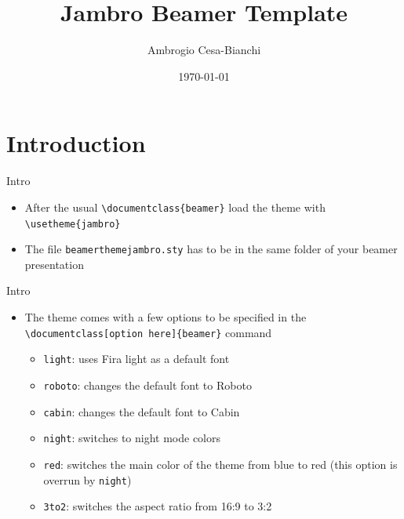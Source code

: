 \documentclass[10pt]{beamer}
\title[]{Jambro Beamer Template}
\author[]{Ambrogio Cesa-Bianchi}
\date{\today}
\begin{document}

\begin{frame}[plain]
\end{frame}

\section{Introduction}
\begin{frame}
	{Intro}
	\begin{itemize}
		\item After the usual \texttt{\textbackslash documentclass\{beamer\}} load the theme with \texttt{\textbackslash usetheme\{jambro\}}\bigskip
		\item The file \texttt{beamerthemejambro.sty} has to be in the same folder of your beamer presentation
	\end{itemize}
\end{frame}


\begin{frame}
	{Intro}
	\begin{itemize}
		\item The theme comes with a few options to be specified in the \texttt{\textbackslash documentclass[option here]\{beamer\}} command \medskip
		\begin{itemize}
			\item \texttt{light}: uses Fira light as a default font\medskip
			\item \texttt{roboto}: changes the default font to Roboto\medskip
			\item \texttt{cabin}: changes the default font to Cabin\medskip
			\item \texttt{night}: switches to night mode colors \medskip
			\item \texttt{red}: switches the main color of the theme from blue to red (this option is overrun by \texttt{night})\medskip
			\item \texttt{3to2}: switches the aspect ratio from 16:9 to 3:2
		\end{itemize}
	\end{itemize}
\end{frame}
\end{document}
